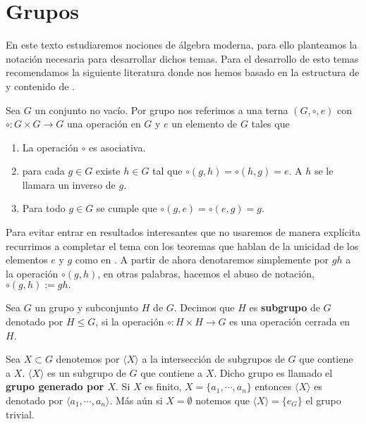 \section{Grupos}
En este texto estudiaremos nociones de álgebra moderna, para ello planteamos la notación necesaria para desarrollar dichos temas. Para el desarrollo de esto temas recomendamos la siguiente literatura donde nos hemos basado en la estructura de \cite{alg_grove} y contenido de \cite{alg_ii}.

	\begin{df}
Sea $G$ un conjunto no vacío. Por grupo nos referimos a una terna $(G, \circ, e)$ con $\circ:G \times G \to G$ una operación en $G$ y $e$ un elemento de $G$ tales que

	\begin{enumerate}
		\item La operación $\circ$ es asociativa.
		\item para cada $g \in G$ existe $h \in G$ tal que $ \circ (g,h)= \circ(h ,g)=e$. A $h$ se le llamara un inverso de $g$. 
		\item Para todo $g \in G$ se cumple que $\circ(g ,e) =  \circ(e,g) = g.$
	\end{enumerate}
	\end{df}

	\begin{cn}
Para evitar entrar en resultados interesantes que no usaremos de manera explícita recurrimos a completar el tema con los teoremas que hablan de la unicidad de los elementos $e$ y $g$ como en \cite{alg_grove}. A partir de ahora denotaremos simplemente por $gh$ a la operación $\circ(g,h)$, en otras palabras, hacemos el abuso de notación,  $\circ(g,h):=gh.$
	\end{cn}
	
	\begin{df}
	Sea $G$ un grupo y subconjunto $H$ de $G$. Decimos que $H$ es \textbf{subgrupo} de $G$ denotado por $H \leq G$, si la operación $\circ:H \times H \to G$ es una operación cerrada en $H$.	
		\end{df}
		
\begin{ob}	
Sea $X \subset G$ denotemos por $\langle X \rangle$ a la intersección de subgrupos de $G$ que contiene a $X$. $\langle X \rangle$ es un subgrupo de $G$ que contiene a $X$. Dicho grupo es llamado el \textbf{grupo generado por $X$}. Si $X$ es finito, $X=\{ a_1, \cdots , a_n\}$ entonces $\langle X \rangle$ es denotado por $\langle a_1, \cdots, a_n \rangle$. Más aún si $X=\emptyset$ notemos que $\langle X \rangle=\{e_G\}$ el grupo trivial.
\end{ob}

